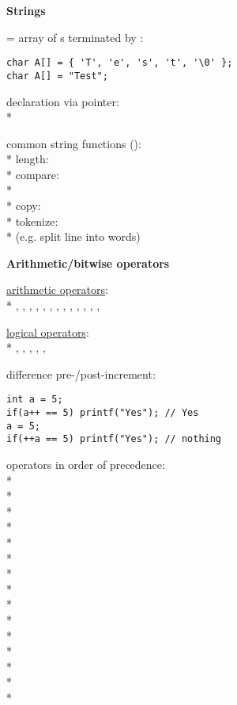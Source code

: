 \textbf{Strings}
\begin{items}
  \item = array of s terminated by :
  \begin{lstlisting}[style=customc]
char A[] = { 'T', 'e', 's', 't', '\0' };
char A[] = "Test";
  \end{lstlisting}
  \item declaration via pointer: \\*
  \item common string functions (): \\*
    length:  \\*
    compare: \\* \phantom{x}  \\*
    copy:  \\*
    tokenize:  \\* \phantom{x} (e.g. split line into words)
\end{items}

\textbf{Arithmetic/bitwise operators}
\begin{items}
  \item \underline{arithmetic operators}: \\*
    , , , , , , , , , , , , , 
  \item \underline{logical operators}: \\*
    , , , , , 
  \item difference pre-/post-increment:
  \begin{lstlisting}[style=customc]
int a = 5;
if(a++ == 5) printf("Yes"); // Yes
a = 5;
if(++a == 5) printf("Yes"); // nothing
  \end{lstlisting}
  \item operators in order of precedence: \\*
     \\*
     \\*
    \code{*, /, \%} \\*
    \code{+, -} \\*
    \code{<<, >>} \\*
    \code{<, <=, >, >=} \\*
    \code{==, !=} \\*
    \code{&} \\*
    \code{^} \\*
    \code{\|} \\*
    \code{&&} \\*
    \code{\|\|} \\*
     \\*
    \code{=, +=, -=, *=, /=, \%=, &=, ~=, |=, <<=, >>=} \\*
    \code{,}
\end{items}

